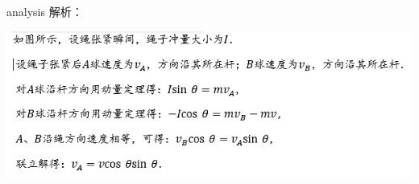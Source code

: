 \begin{example}
 	
 	\begin{taggedblock}{analysis}
 		解析：
 		\begin{center}
\includegraphics[width=0.8\linewidth]{image/momentum-9}
\end{center}

 	\end{taggedblock}
 \end{example}
 
